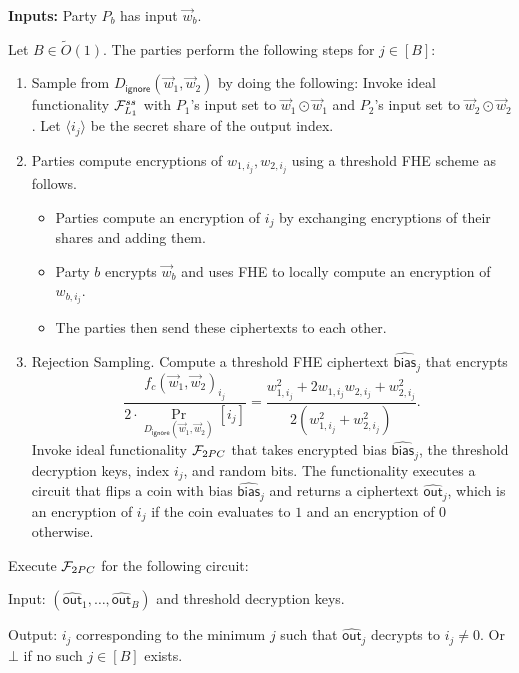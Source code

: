 \begin{algorithm}[htbp]
\textbf{Inputs:} Party $P_b$ has input $\vec{w}_b$. 

\BEN
\item Let $B \in \tilde{O}(1)$. The parties perform
the following steps for $j \in [B]$:

\begin{enumerate}
\item Sample from $D_{\mathsf{ignore}}(\vec{w}_1,\vec{w}_2)$
by doing the following:
Invoke ideal functionality $\mathcal{F}_{L_1}^{ss}$ with $P_1$'s input set to $\vec{w}_1 \odot \vec{w}_1$
and $P_2$'s input 
set to $\vec{w}_2 \odot \vec{w}_2$. 
Let $\langle i_j \rangle$ be the secret share of the output
index. 

\item Parties compute encryptions of $w_{1,i_j}, w_{2,i_j}$ using a threshold FHE
scheme as follows.  
\begin{itemize}\item Parties compute an encryption of $i_j$ by exchanging encryptions of their shares and adding them.  \item Party $b$ encrypts $\vec{w}_b$ and uses FHE to locally compute an encryption of $w_{b,i_j}$. \item  The parties then send these ciphertexts to each other.\end{itemize}

\item Rejection Sampling. Compute a threshold FHE ciphertext $\widehat{\mathsf{bias}}_j$ that
encrypts
\[
\frac{f_c(\vec{w}_1, \vec{w}_2)_{i_j}}{2 \cdot \Pr_{D_{\mathsf{ignore}}(\vec{w}_1, \vec{w}_2)}[i_j]} =
\frac{w_{1,i_j}^2 + 2w_{1,i_j}w_{2,i_j}+w_{2,i_j}^2}{2(w_{1,i_j}^2 + w_{2,i_j}^2)}.
\]
Invoke ideal functionality $\mathcal{F}_{2PC}$ 
that takes  encrypted bias $\widehat{\mathsf{bias}}_j$, the threshold decryption keys, index $i_j$, and random bits. The functionality executes a circuit that flips a coin with bias $\widehat{\mathsf{bias}}_j$ and returns a ciphertext $\widehat{\mathsf{out}}_j$, which is
an encryption of $i_j$ if the coin evaluates to $1$
and an encryption of $0$ otherwise.
\end{enumerate}

\item Execute $\mathcal{F}_{2PC}$ for the following circuit: 
      \BEN
      \item Input: $(\widehat{\mathsf{out}}_1, \ldots, \widehat{\mathsf{out}}_B)$ and threshold decryption keys. 
      \item Output: $i_j$ corresponding to the minimum
      $j$ such that $\widehat{\mathsf{out}}_j$ decrypts to $i_j \neq 0$.
      Or $\bot$ if no such $j \in [B]$ exists.
      \EEN
\EEN

\caption{Two-party $L_2$ sampling in the $(\F_{L_1}, F_{2PC})$-hybrid.}
\label{fig:l2}
\end{algorithm}

